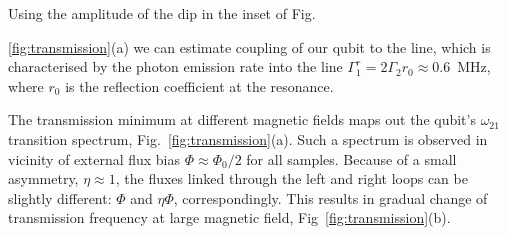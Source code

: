 \documentclass[%
reprint,
superscriptaddress,
bibnotes,
amsmath,
amssymb,
aps,
showkeys,
prb,
]{revtex4-1}
\begin{document}
Using the amplitude of the dip in the inset of Fig.~{\ref{fig:transmission}(a) we can estimate coupling of our qubit to the line\cite{Astafiev_2010,Peng_2016}, which is characterised by the photon emission rate into the line $\Gamma_1^r =  2\Gamma_2 r_{0} \approx 0.6$~MHz, where $r_{0}$ is the reflection coefficient at the resonance.

The transmission minimum at different magnetic fields
maps   out   the   qubit's   $\omega_{21}$  transition   spectrum, Fig.~\ref{fig:transmission}(a).
Such a spectrum is observed in vicinity of external flux bias $\Phi \approx \Phi_0/2$ for all samples.
Because  of  a  small
asymmetry, $\eta\approx1$, the fluxes linked through  the left and right loops can be slightly
different: $ \Phi$ and $ \eta\Phi $, correspondingly. This results in gradual change of transmission frequency at large magnetic field, Fig~\ref{fig:transmission}(b).

}
\end{document}
